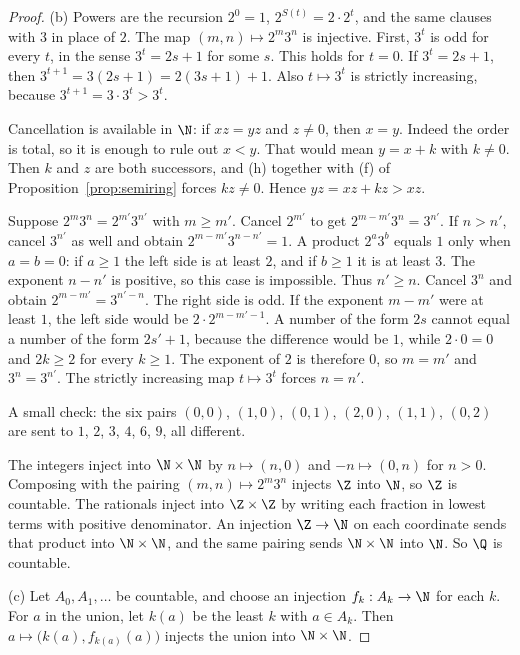 \begin{proof}
(b) Powers are the recursion $2^0=1$, $2^{S(t)}=2\cdot 2^t$, and the same clauses with $3$ in place of $2$. The map $(m,n)\mapsto 2^m 3^n$ is injective. First, $3^t$ is odd for every $t$, in the sense $3^t=2s+1$ for some $s$. This holds for $t=0$. If $3^t=2s+1$, then $3^{t+1}=3(2s+1)=2(3s+1)+1$. Also $t\mapsto 3^t$ is strictly increasing, because $3^{t+1}=3\cdot 3^t>3^t$.

Cancellation is available in $\N$: if $xz=yz$ and $z\ne 0$, then $x=y$. Indeed the order is total, so it is enough to rule out $x<y$. That would mean $y=x+k$ with $k\ne 0$. Then $k$ and $z$ are both successors, and (h) together with (f) of Proposition~\ref{prop:semiring} forces $kz\ne 0$. Hence $yz=xz+kz>xz$.

Suppose $2^m 3^n=2^{m'}3^{n'}$ with $m\ge m'$. Cancel $2^{m'}$ to get $2^{m-m'}3^n=3^{n'}$. If $n>n'$, cancel $3^{n'}$ as well and obtain $2^{m-m'}3^{n-n'}=1$. A product $2^a 3^b$ equals $1$ only when $a=b=0$: if $a\ge 1$ the left side is at least $2$, and if $b\ge 1$ it is at least $3$. The exponent $n-n'$ is positive, so this case is impossible. Thus $n'\ge n$. Cancel $3^n$ and obtain $2^{m-m'}=3^{n'-n}$. The right side is odd. If the exponent $m-m'$ were at least $1$, the left side would be $2\cdot 2^{m-m'-1}$. A number of the form $2s$ cannot equal a number of the form $2s'+1$, because the difference would be $1$, while $2\cdot 0=0$ and $2k\ge 2$ for every $k\ge 1$. The exponent of $2$ is therefore $0$, so $m=m'$ and $3^n=3^{n'}$. The strictly increasing map $t\mapsto 3^t$ forces $n=n'$.

A small check: the six pairs $(0,0)$, $(1,0)$, $(0,1)$, $(2,0)$, $(1,1)$, $(0,2)$ are sent to $1$, $2$, $3$, $4$, $6$, $9$, all different.

The integers inject into $\N\times\N$ by $n\mapsto(n,0)$ and $-n\mapsto(0,n)$ for $n>0$. Composing with the pairing $(m,n)\mapsto 2^m3^n$ injects $\Z$ into $\N$, so $\Z$ is countable. The rationals inject into $\Z\times\Z$ by writing each fraction in lowest terms with positive denominator. An injection $\Z\to\N$ on each coordinate sends that product into $\N\times\N$, and the same pairing sends $\N\times\N$ into $\N$. So $\Q$ is countable.

(c) Let $A_0,A_1,\ldots$ be countable, and choose an injection $f_k:A_k\to\N$ for each $k$. For $a$ in the union, let $k(a)$ be the least $k$ with $a\in A_k$. Then $a\mapsto\bigl(k(a),f_{k(a)}(a)\bigr)$ injects the union into $\N\times\N$.
\end{proof}

